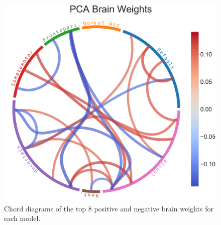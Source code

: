 \begin{figure}
\includegraphics[width=0.49\linewidth]{figures/regularization/hcp/PCA brain weights}
\caption{Chord diagrams of the top 8 positive and negative brain weights for each model.}\label{fig:chord_weights}
\end{figure}

